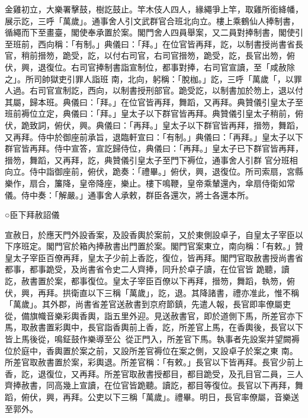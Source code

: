 \begin{pinyinscope}
 金雞初立，大樂署擊鼓，樹訖鼓止。竿木伎人四人，緣繩爭上竿，取雞所銜絳幡，展示訖，三呼「萬歲」。通事舍人引文武群官合班北向立。樓上乘鶴仙人捧制書，循繩而下至畫臺，閣使奉承置於案。閣門舍人四員舉案，又二員對捧制書，閣使引至班前，西向稱：「有制。」典儀曰：「拜。」在位官皆再拜，訖，以制書授尚書省長官，稍前搢笏，跪受，訖，以付右司官，右司官搢笏，跪受，訖，長官出笏，俯伏，興，退復位。右司官捧制書詣宣制位，都事對捧，右司官宣讀，至「咸赦除之」。所司帥獄吏引罪人詣班
 南，北向，躬稱：「脫枷。」訖，三呼「萬歲「，以罪人過。右司官宣制訖，西向，以制書授刑部官。跪受訖，以制書加於笏上，退以付其屬，歸本班。典儀曰：「拜。」在位官皆再拜，舞蹈，又再拜。典贊儀引皇太子至班前褥位立定，典儀曰：「拜。」皇太子以下群官皆再拜。典贊儀引皇太子稍前，俯伏，跪致詞，俯伏，興。典儀曰：「再拜。」皇太子以下群官皆再拜，搢笏，舞蹈，又再拜。侍中於御座前承旨，退臨軒宣曰：「有制。」典儀曰：「再拜。」皇太子以下群官皆再拜。侍中宣答，宣訖歸侍位，典儀曰：「再拜。」皇太子已下群官皆再拜，搢笏，舞蹈，又再拜，訖，典贊儀引皇太子至門下褥位，通事舍人引群
 官分班相向立。侍中詣御座前，俯伏，跪奏：「禮畢。」俯伏，興，退復位。所司索扇，宮縣樂作，扇合，簾降，皇帝降座，樂止。樓下鳴鞭，皇帝乘輦還內，傘扇侍衛如常儀。侍中奏：「解嚴。」通事舍人承敕，群臣各還次，將士各還本所。



 ○臣下拜赦詔儀



 宣赦日，於應天門外設香案，及設香輿於案前，又於東側設卓子，自皇太子宰臣以下序班定。閣門官於箱內捧赦書出門置於案。閣門官案東立，南向稱：「有敕。」贊皇太子宰臣百僚再拜，皇太子少前上香訖，復位，皆再拜。閣門官取赦書授尚書省都事，都事跪受，及尚書省令史二人齊捧，同升於卓子讀，在位官皆
 跪聽，讀訖，赦書置於案，都事復位。皇太子宰臣百僚以下再拜，搢笏，舞蹈，執笏，俯伏，興，再拜。拱衛直以下三稱「萬歲」，訖，退。其降諸書，禮亦准此，惟不稱「萬歲」。其外郡，尚書省差官送赦書到京府節鎮，先遣人報，長官即率僚屬吏從，備旗幟音樂彩輿香輿，詣五里外迎。見送赦書官，即於道側下馬，所差官亦下馬，取赦書置彩輿中，長官詣香輿前上香，訖，所差官上馬，在香輿後，長官以下皆上馬後從，鳴鉦鼓作樂導至公，從正門入，所差官下馬。執事者先設案并望闕褥位於庭中，香輿置於案之前，又設所差官褥位在案之側，又設卓子於案之東
 南。所差官取赦書置於案，彩輿退。所差官稱：「有敕。」長官以下皆再拜。長官少前上香，訖，退復位，又再拜。所差官取赦書授都目，都目跪受，及孔目官二員，三人齊捧赦書，同高幾上宣讀，在位官皆跪聽。讀訖，都目等復位。長官以下再拜，舞蹈，俯伏，興，再拜。公吏以下三稱「萬歲」。禮畢。明日，長官率僚屬，音樂送至郭外。



\end{pinyinscope}